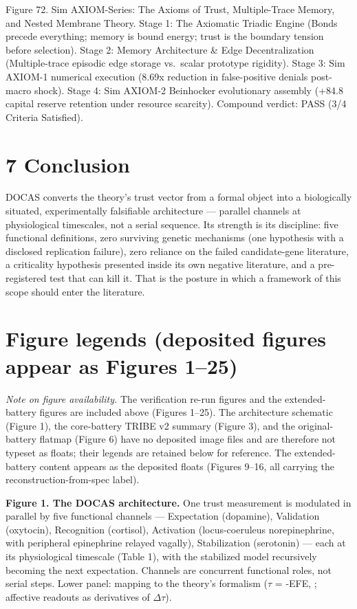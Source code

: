 \documentclass[
]{article}
\begin{document}
Figure 72. Sim AXIOM-Series: The Axioms of Trust, Multiple-Trace Memory,
and Nested Membrane Theory. Stage 1: The Axiomatic Triadic Engine (Bonds
precede everything; memory is bound energy; trust is the boundary
tension before selection). Stage 2: Memory Architecture \& Edge
Decentralization (Multiple-trace episodic edge storage vs.~scalar
prototype rigidity). Stage 3: Sim AXIOM-1 numerical execution (8.69x
reduction in false-positive denials post-macro shock). Stage 4: Sim
AXIOM-2 Beinhocker evolutionary assembly (+84.8 capital reserve
retention under resource scarcity). Compound verdict: PASS (3/4 Criteria
Satisfied).

\section{7 Conclusion}\label{conclusion}

DOCAS converts the theory's trust vector from a formal object into a
biologically situated, experimentally falsifiable architecture ---
parallel channels at physiological timescales, not a serial sequence.
Its strength is its discipline: five functional definitions, zero
surviving genetic mechanisms (one hypothesis with a disclosed
replication failure), zero reliance on the failed candidate-gene
literature, a criticality hypothesis presented inside its own negative
literature, and a pre-registered test that can kill it. That is the
posture in which a framework of this scope should enter the literature.

\section{Figure legends (deposited figures appear as Figures
1--25)}\label{figure-legends-deposited-figures-appear-as-figures-125}

\emph{Note on figure availability.} The verification re-run figures and
the extended-battery figures are included above (Figures 1--25). The
architecture schematic (Figure 1), the core-battery TRIBE v2 summary
(Figure 3), and the original-battery flatmap (Figure 6) have no
deposited image files and are therefore not typeset as floats; their
legends are retained below for reference. The extended-battery content
appears as the deposited floats (Figures 9--16, all carrying the
reconstruction-from-spec label).

\textbf{Figure 1. The DOCAS architecture.} One trust measurement is
modulated in parallel by five functional channels --- Expectation
(dopamine), Validation (oxytocin), Recognition (cortisol), Activation
(locus-coeruleus norepinephrine, with peripheral epinephrine relayed
vagally), Stabilization (serotonin) --- each at its physiological
timescale (Table 1), with the stabilized model recursively becoming the
next expectation. Channels are concurrent functional roles, not serial
steps. Lower panel: mapping to the theory's formalism (\(\tau\) = -EFE,
; affective readouts as derivatives of \(\Delta\tau\)).
\end{document}
